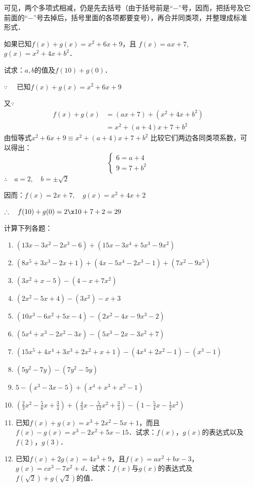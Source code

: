 可见，两个多项式相减，仍是先去括号（由于括号前是“$-$”号，因而，把括号及它前面的“$-$”号去掉后，括号里面的各项都要变号），再合并同类项，并整理成标准形式．

\begin{example}
    如果已知$f(x)+g(x)=x^2+6x+9$，且
$f (x) =ax+7$, $g (x) =x^2+4x+b^2$．

试求：$a,b$的值及$f(10)+g(0)$．
\end{example}

\begin{solution}
$\because\quad $ 已知$f(x)+g(x)=x^2+6x+9$

又$\because\quad $
\[\begin{split}
    f(x)+g(x)&=(ax+7)+(x^2+4x+b^2)\\
    &=x^2+ (a+4) x+7+b^2
\end{split}\]
    由恒等式$x^2+6x+9\equiv x^2+(a+4)x+7+b^2$
    比较它们两边各同类项系数，可以得出：
\[\begin{cases}
    6=a+4\\
    9=7+b^2
\end{cases}\]
$\therefore\quad a=2,\quad b=\pm\sqrt{2}$

因而：$f(x)=2x+7,\quad g(x)=x^2+4x+2$

$\therefore\quad f(10)+g(0)=2\x 10+7+2=29$
\end{solution}

\begin{ex}
    计算下列各题：
\begin{enumerate}
    \item $(13x-3x^2-2x^3-6)+ (15x-3x^4+5x^3-9x^2)$
    \item $(8x^5+3x^3-2x+1)+(4x-5x^4-2x^3-1)+(7x^2-9x^5)$
    \item $(3x^2+x-5)-(4-x+7x^2)$
    \item $(2x^2-5x+4)-(3x^2)-x+3$
    \item $(10x^3-6x^2+5x-4)-(2x^2-4x-9x^3-2)$
    \item $(5x^4+x^3-2x^2-3x)-(5x^3-2x-3x^2+7)$
    \item $(15x^5+4x^4+3x^3+2x^2+x+1)-(4x^4+2x^2-1)-(x^3-1)$
    \item $(5y^2-7y)-(7y^2-5y)$
    \item $5-(x^3-3x-5)+(x^4+x^3+x^2-1)$
    \item $\left(\frac{2}{3}x^2-\frac{5}{6}x+\frac{3}{4}\right)+\left(\frac{4}{3}x-\frac{5}{12}x^2+\frac{3}{4}\right)-\left(1-\frac{5}{4}x-\frac{1}{2}x^2\right)$
    \item 已知$f(x)+g(x)=x^3+2x^2-5x+1$，而且$f(x)-g(x)=x^3-2x^2+5x-15$．试求：$f(x)$，$g(x)$的表达式以及$f(2)$，$g(3)$．
    \item 已知$f(x)+2g(x)=4x^3+9$，且$f(x)=ax^2+bx-3$，$g(x)=cx^3-7x^2+d$．试求：$f(x)$与$g(x)$的表达式及$f(\sqrt{2})+g(\sqrt{2})$的值．
\end{enumerate}
\end{ex}


